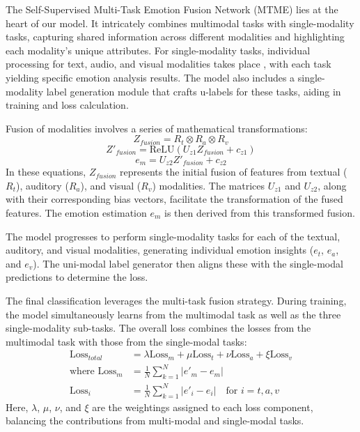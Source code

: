 \documentclass[preprint,12pt]{elsarticle}
\begin{document}
The Self-Supervised Multi-Task Emotion Fusion Network (MTME) lies at the heart of our model. It intricately combines multimodal tasks with single-modality tasks, capturing shared information across different modalities and highlighting each modality's unique attributes. For single-modality tasks, individual processing for text, audio, and visual modalities takes place \cite{ref43}, with each task yielding specific emotion analysis results. The model also includes a single-modality label generation module that crafts u-labels for these tasks, aiding in training and loss calculation.

Fusion of modalities involves a series of mathematical transformations:
\begin{equation}
Z_{fusion} = R_t \otimes R_a \otimes R_v
\end{equation}
\begin{equation}
Z'_{fusion} = \text{ReLU}(U_{z1} Z_{fusion} + c_{z1})
\end{equation}
\begin{equation}
e_m = U_{z2} Z'_{fusion} + c_{z2}
\end{equation}
In these equations, \(Z_{fusion}\) represents the initial fusion of features from textual (\(R_t\)), auditory (\(R_a\)), and visual (\(R_v\)) modalities. The matrices \(U_{z1}\) and \(U_{z2}\), along with their corresponding bias vectors, facilitate the transformation of the fused features. The emotion estimation \(e_m\) is then derived from this transformed fusion.

The model progresses to perform single-modality tasks for each of the textual, auditory, and visual modalities, generating individual emotion insights (\(e_t\), \(e_a\), and \(e_v\)). The uni-modal label generator then aligns these with the single-modal predictions to determine the loss.

The final classification leverages the multi-task fusion strategy. During training, the model simultaneously learns from the multimodal task as well as the three single-modality sub-tasks. The overall loss combines the losses from the multimodal task with those from the single-modal tasks:
\begin{align}
\text{Loss}_{total} &= \lambda \text{Loss}_m + \mu \text{Loss}_t + \nu \text{Loss}_a + \xi \text{Loss}_v \\
\text{where } \text{Loss}_m &= \frac{1}{N} \sum_{k=1}^{N} |e'_m - e_m| \\
\text{Loss}_i &= \frac{1}{N} \sum_{k=1}^{N} |e'_i - e_i| \quad \text{for } i = t, a, v
\end{align}
Here, \( \lambda \), \( \mu \), \( \nu \), and \( \xi \) are the weightings assigned to each loss component, balancing the contributions from multi-modal and single-modal tasks.
\end{document}
